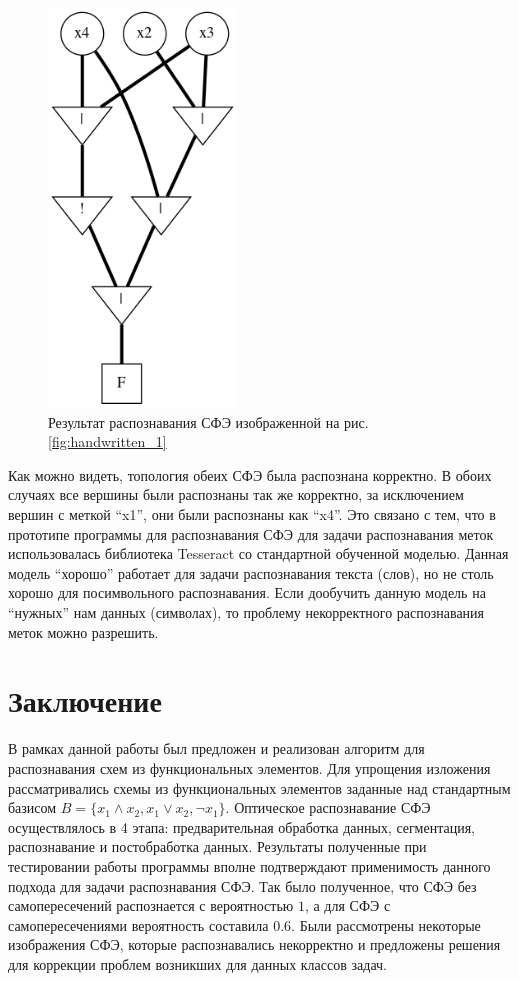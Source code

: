 \documentclass[makeidx, a4paper, 14pt]{extarticle}
\begin{document}
\begin{figure}[H]
\end{figure}

\begin{figure}[H]
    \centering
    \includegraphics[width=50mm]{handwritten_1_result.png}
    \caption{Результат распознавания СФЭ изображенной на рис. \ref{fig:handwritten_1}}
\end{figure}

Как можно видеть, топология обеих СФЭ была распознана корректно. В обоих случаях все вершины были распознаны так же корректно, за исключением вершин с меткой ``x1'', они были распознаны как ``x4''.
Это связано с тем, что в прототипе программы для распознавания СФЭ для задачи распознавания меток использовалась библиотека Tesseract со стандартной обученной моделью.
Данная модель ``хорошо'' работает для задачи распознавания текста (слов), но не столь хорошо для посимвольного распознавания.
Если дообучить данную модель на ``нужных'' нам данных (символах), то проблему некорректного распознавания меток можно разрешить.

\section{Заключение}
В рамках данной работы был предложен и реализован алгоритм для распознавания схем из функциональных элементов.
Для упрощения изложения рассматривались схемы из функциональных элементов заданные над стандартным базисом ${B = \{x_1 \wedge x_2, x_1 \vee x_2, \neg{x_1}\}}$.
Оптическое распознавание СФЭ осуществлялось в 4 этапа: предварительная обработка данных, сегментация, распознавание и постобработка данных.
Результаты полученные при тестировании работы программы вполне подтверждают применимость данного подхода для задачи распознавания СФЭ.
Так было полученное, что СФЭ без самопересечений распознается с вероятностью $1$, а для СФЭ с самопересечениями вероятность составила $0.6$.
Были рассмотрены некоторые изображения СФЭ, которые распознавались некорректно и предложены решения для коррекции проблем возникших для данных классов задач.
\end{document}
